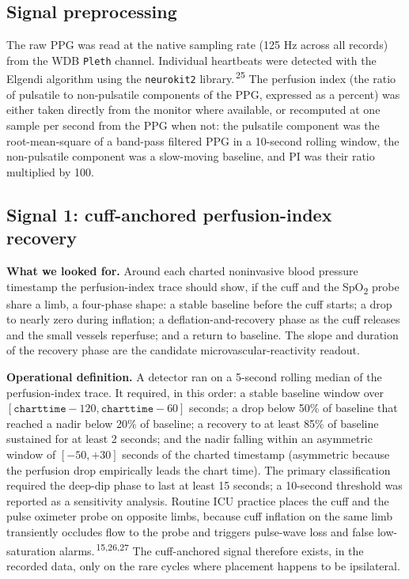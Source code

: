 \documentclass[twocolumn,letterpaper,10pt]{article}
\renewcommand{\cite}[1]{\textsuperscript{\,#1}}
\begin{document}
\subsection{Signal preprocessing}

The raw PPG was read at the native sampling rate (125 Hz across all records) from the WDB \texttt{Pleth} channel. Individual heartbeats were detected with the Elgendi algorithm using the \texttt{neurokit2} library.\cite{25} The perfusion index (the ratio of pulsatile to non-pulsatile components of the PPG, expressed as a percent) was either taken directly from the monitor where available, or recomputed at one sample per second from the PPG when not: the pulsatile component was the root-mean-square of a band-pass filtered PPG in a 10-second rolling window, the non-pulsatile component was a slow-moving baseline, and PI was their ratio multiplied by 100.

\subsection{Signal 1: cuff-anchored perfusion-index recovery}

\textbf{What we looked for.} Around each charted noninvasive blood pressure timestamp the perfusion-index trace should show, if the cuff and the SpO\textsubscript{2} probe share a limb, a four-phase shape: a stable baseline before the cuff starts; a drop to nearly zero during inflation; a deflation-and-recovery phase as the cuff releases and the small vessels reperfuse; and a return to baseline. The slope and duration of the recovery phase are the candidate microvascular-reactivity readout.

\textbf{Operational definition.} A detector ran on a 5-second rolling median of the perfusion-index trace. It required, in this order: a stable baseline window over $[\texttt{charttime}-120, \texttt{charttime}-60]$ seconds; a drop below 50\% of baseline that reached a nadir below 20\% of baseline; a recovery to at least 85\% of baseline sustained for at least 2 seconds; and the nadir falling within an asymmetric window of $[-50, +30]$ seconds of the charted timestamp (asymmetric because the perfusion drop empirically leads the chart time). The primary classification required the deep-dip phase to last at least 15 seconds; a 10-second threshold was reported as a sensitivity analysis. Routine ICU practice places the cuff and the pulse oximeter probe on opposite limbs, because cuff inflation on the same limb transiently occludes flow to the probe and triggers pulse-wave loss and false low-saturation alarms.\cite{15,26,27} The cuff-anchored signal therefore exists, in the recorded data, only on the rare cycles where placement happens to be ipsilateral.
\end{document}
